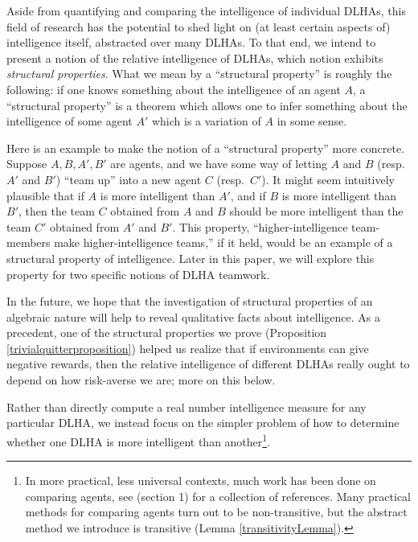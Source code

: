 \documentclass[twoside,11pt]{article}
\begin{document}
Aside from quantifying and comparing the intelligence of individual DLHAs, this field
of research has the potential to shed light on (at least certain aspects of)
intelligence itself,
abstracted over many DLHAs.
To that end, we intend to present a notion of the relative
intelligence of DLHAs, which notion exhibits
\emph{structural properties}. What we mean by
a ``structural property'' is roughly the following: if one knows something about the
intelligence of an agent $A$, a ``structural property'' is a theorem which allows one
to infer something about the intelligence of some agent $A'$ which is a variation of
$A$ in some sense.

Here is an example to make the notion of a ``structural property'' more
concrete. Suppose $A,B,A',B'$ are agents, and we have some way of letting
$A$ and $B$ (resp.~$A'$ and $B'$) ``team up'' into a new agent $C$ (resp.~$C'$).
It might seem intuitively plausible that if $A$ is more
intelligent than $A'$, and if $B$ is more intelligent than $B'$, then the team
$C$ obtained from $A$ and $B$ should be more intelligent than the team $C'$
obtained from $A'$ and $B'$. This property, ``higher-intelligence team-members
make higher-intelligence teams,'' if it held, would be an example of a structural property
of intelligence. Later in this paper, we will explore this property for
two specific notions of DLHA teamwork.

In the future, we hope that the investigation of structural properties of an
algebraic nature will help to reveal qualitative facts about intelligence.
As a precedent, one of the structural properties we prove (Proposition
\ref{trivialquitterproposition}) helped us realize that if environments can
give negative rewards, then the relative intelligence of different DLHAs
really ought to depend on how risk-averse we are; more on this below.

Rather than directly compute a real number intelligence measure for any
particular DLHA, we instead focus on the simpler problem of
how to determine whether one DLHA is more intelligent
than another\footnote{In more practical, less universal contexts, much work has
been done on comparing agents, see \cite{balduzzi} (section 1) for a collection
of references. Many practical methods for comparing agents turn out to be non-transitive,
but the abstract method we introduce is transitive (Lemma \ref{transitivityLemma}).}.
\end{document}
